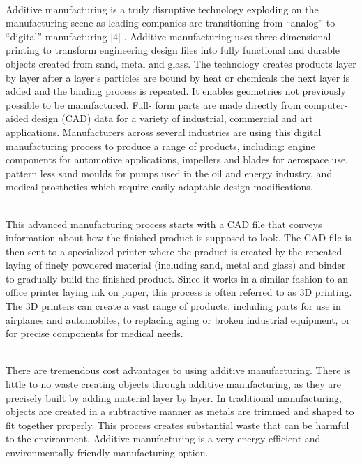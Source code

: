 \documentclass[12pt,a4paper]{report}
\begin{document}
	\indent
	\\Additive manufacturing is a truly disruptive technology exploding on the manufacturing scene
	as leading companies are transitioning from “analog” to “digital” manufacturing [4] . Additive
	manufacturing uses three dimensional printing to transform engineering design files into fully
	functional and durable objects created from sand, metal and glass. The technology creates products
	layer by layer after a layer’s particles are bound by heat or chemicals the next layer is added and the
	binding process is repeated. It enables geometries not previously possible to be manufactured. Full-
	form parts are made directly from computer-aided design (CAD) data for a variety of industrial,
	commercial and art applications. Manufacturers across several industries are using this digital
	manufacturing process to produce a range of products, including: engine components for
	automotive applications, impellers and blades for aerospace use, pattern less sand moulds for pumps
	used in the oil and energy industry, and medical prosthetics which require easily adaptable design
	modifications.\par
	
	\indent
	\\This advanced manufacturing process starts with a CAD file that conveys information about
	how the finished product is supposed to look. The CAD file is then sent to a specialized printer
	where the product is created by the repeated laying of finely powdered material (including sand,
	metal and glass) and binder to gradually build the finished product. Since it works in a similar
	fashion to an office printer laying ink on paper, this process is often referred to as 3D printing. The
	3D printers can create a vast range of products, including parts for use in airplanes and automobiles,
	to replacing aging or broken industrial equipment, or for precise components for medical needs.\par
	
	\indent
	\\There are tremendous cost advantages to using additive manufacturing. There is little to no
	waste creating objects through additive manufacturing, as they are precisely built by adding
	material layer by layer. In traditional manufacturing, objects are created in a subtractive manner as
	metals are trimmed and shaped to fit together properly. This process creates substantial waste that
	can be harmful to the environment. Additive manufacturing is a very energy efficient and
	environmentally friendly manufacturing option.\par
	
\end{document}
